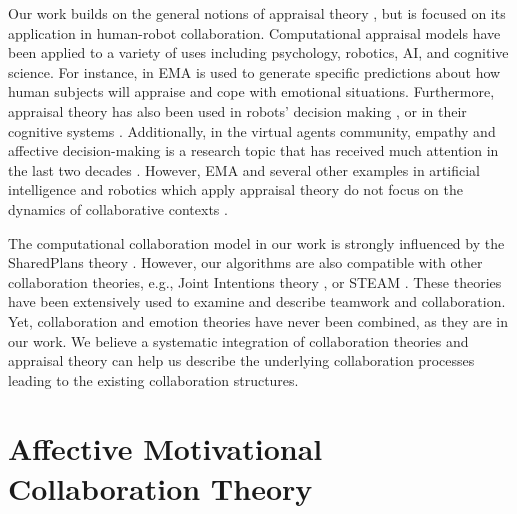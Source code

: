 \documentclass{aamas2016}
\begin{document}
Our work builds on the general notions of appraisal theory
\cite{gratch:domain-independent,marsella:computational,scherer:sequential-appraisal-process,scherer:appraisal-processes},
but is focused on its application in human-robot collaboration. Computational
appraisal models have been applied to a variety of uses including psychology,
robotics, AI, and cognitive science. For instance, in
\cite{marsella:ema-process-model} EMA is used to generate specific predictions
about how human subjects will appraise and cope with emotional situations.
Furthermore, appraisal theory has also been used in robots' decision making
\cite{castro:autonomous-robot-fear}, or in their cognitive systems
\cite{hudlicka:emotinos-reasons,marinier:emotion-reinforcement}. Additionally,
in the virtual agents community, empathy and affective decision-making is a
research topic that has received much attention in the last two decades
\cite{scott:modeling-empathy-agent,paiva:agent-care,pontier:women-robot-men,velasquez:emotions-motivations-agents}.
However, EMA and several other examples in artificial intelligence and robotics
which apply appraisal theory do not focus on the dynamics of collaborative
contexts
\cite{adam:bdi-emotional-companion,kim:model-hri-appraisal,marsella:ema-process-model,rosenbloom:sigma-appraisal}.

The computational collaboration model in our work is strongly influenced by the
SharedPlans theory \cite{grosz:plans-discourse}. However, our algorithms are
also compatible with other collaboration theories, e.g., Joint Intentions theory
\cite{cohen:teamwork}, or STEAM \cite{tambe:flexible-teamwork}. These theories
have been extensively used to examine and describe teamwork and collaboration.
Yet, collaboration and emotion theories have never been combined, as they are in
our work. We believe a systematic integration of collaboration theories and
appraisal theory can help us describe the underlying collaboration processes
leading to the existing collaboration structures.

\vspace*{3mm}
\section{Affective Motivational Collaboration Theory}
\end{document}
